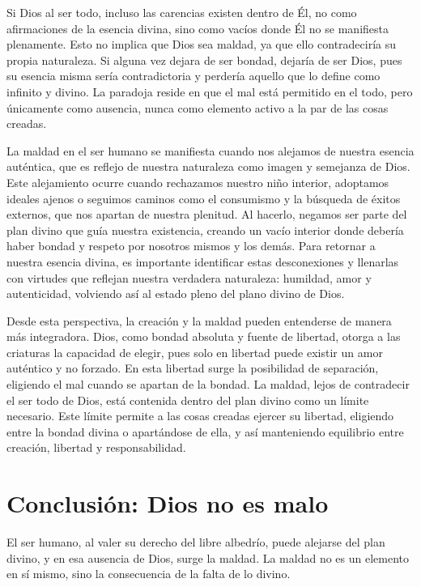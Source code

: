 \documentclass[letterpaper,13pt]{article}
\begin{document}
Si Dios al ser todo, incluso las carencias existen dentro de Él, no como afirmaciones de la esencia divina, sino como vacíos donde Él no se manifiesta plenamente. Esto no implica que Dios sea maldad, ya que ello contradeciría su propia naturaleza. Si alguna vez dejara de ser bondad, dejaría de ser Dios, pues su esencia misma sería contradictoria y perdería aquello que lo define como infinito y divino. La paradoja reside en que el mal está permitido en el todo, pero únicamente como ausencia, nunca como elemento activo a la par de las cosas creadas.

La maldad en el ser humano se manifiesta cuando nos alejamos de nuestra esencia auténtica, que es reflejo de nuestra naturaleza como imagen y semejanza de Dios. Este alejamiento ocurre cuando rechazamos nuestro niño interior, adoptamos ideales ajenos o seguimos caminos como el consumismo y la búsqueda de éxitos externos, que nos apartan de nuestra plenitud. Al hacerlo, negamos ser parte del plan divino que guía nuestra existencia, creando un vacío interior donde debería haber bondad y respeto por nosotros mismos y los demás. Para retornar a nuestra esencia divina, es importante identificar estas desconexiones y llenarlas con virtudes que reflejan nuestra verdadera naturaleza: humildad, amor y autenticidad, volviendo así al estado pleno del plano divino de Dios. 
 
Desde esta perspectiva, la creación y la maldad pueden entenderse de manera más integradora. Dios, como bondad absoluta y fuente de libertad, otorga a las criaturas la capacidad de elegir, pues solo en libertad puede existir un amor auténtico y no forzado. En esta libertad surge la posibilidad de separación, eligiendo el mal cuando se apartan de la bondad. La maldad, lejos de contradecir el ser todo de Dios, está contenida dentro del plan divino como un límite necesario. Este límite permite a las cosas creadas ejercer su libertad, eligiendo entre la bondad divina o apartándose de ella, y así manteniendo equilibrio entre creación, libertad y responsabilidad.

\section{Conclusión: Dios no es malo}

El ser humano, al valer su derecho del libre albedrío, puede alejarse del plan divino, y en esa ausencia de Dios, surge la maldad. La maldad no es un elemento en sí mismo, sino la consecuencia de la falta de lo divino.
\end{document}
